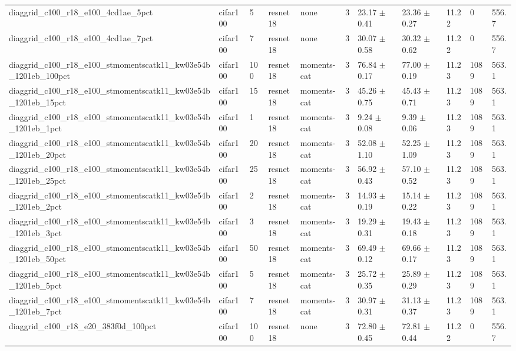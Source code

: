 \begin{tabular}{lllllllllll}
diaggrid_c100_r18_e100_4cd1ae_5pct & cifar100 & 5 & resnet18 & none & 3 & 23.17 $\pm$ 0.41 & 23.36 $\pm$ 0.27 & 11.22 & 0 & 556.7 \\
diaggrid_c100_r18_e100_4cd1ae_7pct & cifar100 & 7 & resnet18 & none & 3 & 30.07 $\pm$ 0.58 & 30.32 $\pm$ 0.62 & 11.22 & 0 & 556.7 \\
diaggrid_c100_r18_e100_stmomentscatk11_kw03e54b_1201eb_100pct & cifar100 & 100 & resnet18 & moments-cat & 3 & 76.84 $\pm$ 0.17 & 77.00 $\pm$ 0.19 & 11.23 & 1089 & 563.1 \\
diaggrid_c100_r18_e100_stmomentscatk11_kw03e54b_1201eb_15pct & cifar100 & 15 & resnet18 & moments-cat & 3 & 45.26 $\pm$ 0.75 & 45.43 $\pm$ 0.71 & 11.23 & 1089 & 563.1 \\
diaggrid_c100_r18_e100_stmomentscatk11_kw03e54b_1201eb_1pct & cifar100 & 1 & resnet18 & moments-cat & 3 & 9.24 $\pm$ 0.08 & 9.39 $\pm$ 0.06 & 11.23 & 1089 & 563.1 \\
diaggrid_c100_r18_e100_stmomentscatk11_kw03e54b_1201eb_20pct & cifar100 & 20 & resnet18 & moments-cat & 3 & 52.08 $\pm$ 1.10 & 52.25 $\pm$ 1.09 & 11.23 & 1089 & 563.1 \\
diaggrid_c100_r18_e100_stmomentscatk11_kw03e54b_1201eb_25pct & cifar100 & 25 & resnet18 & moments-cat & 3 & 56.92 $\pm$ 0.43 & 57.10 $\pm$ 0.52 & 11.23 & 1089 & 563.1 \\
diaggrid_c100_r18_e100_stmomentscatk11_kw03e54b_1201eb_2pct & cifar100 & 2 & resnet18 & moments-cat & 3 & 14.93 $\pm$ 0.19 & 15.14 $\pm$ 0.22 & 11.23 & 1089 & 563.1 \\
diaggrid_c100_r18_e100_stmomentscatk11_kw03e54b_1201eb_3pct & cifar100 & 3 & resnet18 & moments-cat & 3 & 19.29 $\pm$ 0.31 & 19.43 $\pm$ 0.18 & 11.23 & 1089 & 563.1 \\
diaggrid_c100_r18_e100_stmomentscatk11_kw03e54b_1201eb_50pct & cifar100 & 50 & resnet18 & moments-cat & 3 & 69.49 $\pm$ 0.12 & 69.66 $\pm$ 0.17 & 11.23 & 1089 & 563.1 \\
diaggrid_c100_r18_e100_stmomentscatk11_kw03e54b_1201eb_5pct & cifar100 & 5 & resnet18 & moments-cat & 3 & 25.72 $\pm$ 0.35 & 25.89 $\pm$ 0.29 & 11.23 & 1089 & 563.1 \\
diaggrid_c100_r18_e100_stmomentscatk11_kw03e54b_1201eb_7pct & cifar100 & 7 & resnet18 & moments-cat & 3 & 30.97 $\pm$ 0.31 & 31.13 $\pm$ 0.37 & 11.23 & 1089 & 563.1 \\
diaggrid_c100_r18_e20_383f0d_100pct & cifar100 & 100 & resnet18 & none & 3 & 72.80 $\pm$ 0.45 & 72.81 $\pm$ 0.44 & 11.22 & 0 & 556.7 \\

\end{tabular}
